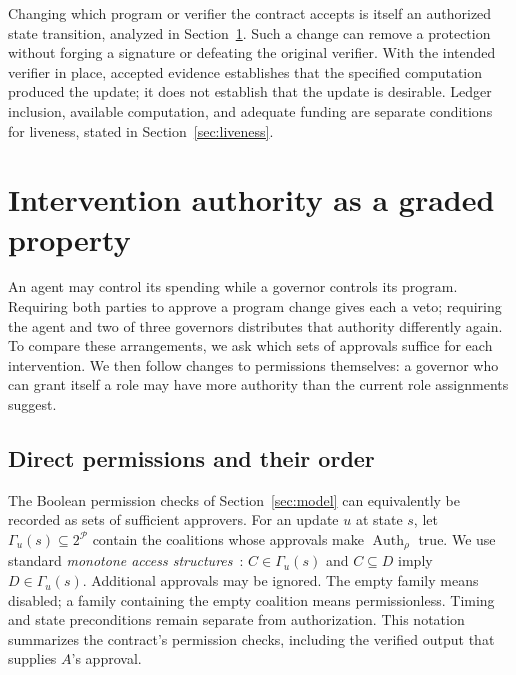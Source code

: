 \documentclass[10pt,letterpaper]{article}
\newcommand{\Pset}{\mathcal P}
\newcommand{\Auth}{\operatorname{Auth}}
\begin{document}
Changing which program or verifier the contract accepts is itself an authorized state transition, analyzed in Section~\ref{sec:authority}. Such a change can remove a protection without forging a signature or defeating the original verifier. With the intended verifier in place, accepted evidence establishes that the specified computation produced the update; it does not establish that the update is desirable. Ledger inclusion, available computation, and adequate funding are separate conditions for liveness, stated in Section~\ref{sec:liveness}.

\section{Intervention authority as a graded property}
\label{sec:authority}
An agent may control its spending while a governor controls its program. Requiring both parties to approve a program change gives each a veto; requiring the agent and two of three governors distributes that authority differently again. To compare these arrangements, we ask which sets of approvals suffice for each intervention. We then follow changes to permissions themselves: a governor who can grant itself a role may have more authority than the current role assignments suggest.

\subsection{Direct permissions and their order}
The Boolean permission checks of Section~\ref{sec:model} can equivalently be recorded as sets of sufficient approvers. For an update $u$ at state $s$, let $\Gamma_u(s)\subseteq2^{\Pset}$ contain the coalitions whose approvals make $\Auth_\rho$ true. We use standard \emph{monotone access structures}~\citep{benaloh1990}: $C\in\Gamma_u(s)$ and $C\subseteq D$ imply $D\in\Gamma_u(s)$. Additional approvals may be ignored. The empty family means disabled; a family containing the empty coalition means permissionless. Timing and state preconditions remain separate from authorization. This notation summarizes the contract's permission checks, including the verified output that supplies $A$'s approval.
\end{document}
